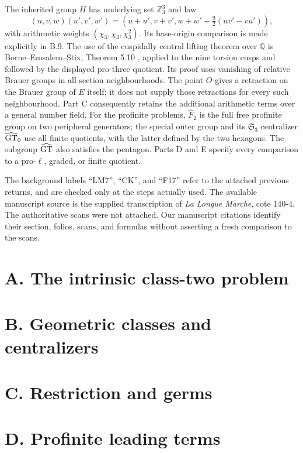 \documentclass[11pt,a4paper]{article}
\newcommand{\Z}{\mathbb Z}
\newcommand{\Q}{\mathbb Q}
\begin{document}
The inherited group $H$ has underlying set $\Z_3^3$ and law
\[
 (u,v,w)(u',v',w')=
 (u+u',v+v',w+w'+\tfrac92(uv'-vu')),
\]
with arithmetic weights $(\chi_3,\chi_3,\chi_3^2)$.
Its base-origin comparison is made explicitly in B.9.
The use of the cuspidally central lifting theorem over $\Q$
is Borne--Emsalem--Stix, Theorem 5.10
\cite{BES2015}, applied to the nine torsion cusps and followed
by the displayed pro-three quotient. Its proof uses vanishing
of relative Brauer groups in all section neighbourhoods.
The point $O$ gives a retraction on the Brauer group of $E$
itself; it does not supply those retractions for every such
neighbourhood. Part C consequently retains the additional
arithmetic terms over a general number field.
For the profinite problems, $\widehat F_2$ is the full free
profinite group on two peripheral generators; the special
outer group and its $\mathfrak S_3$ centralizer
$\widehat{\rm GT}_0$ use all finite quotients, with the latter
defined by the two hexagons. The subgroup $\widehat{\rm GT}$
also satisfies the pentagon. Parts D and E specify every
comparison to a pro-$\ell$, graded, or finite quotient.

The background labels ``LM7'', ``CK'', and ``F17'' refer to the
attached previous returns, and are checked only at the steps
actually used. The available manuscript source is the supplied
transcription of \emph{La Longue Marche}, cote 140-4.
The authoritative scans were not attached. Our manuscript
citations identify their section, folios, scans, and formulas
without asserting a fresh comparison to the scans.
\section{A. The intrinsic class-two problem}
\section{B. Geometric classes and centralizers}
\section{C. Restriction and germs}
\section{D. Profinite leading terms}
\end{document}
